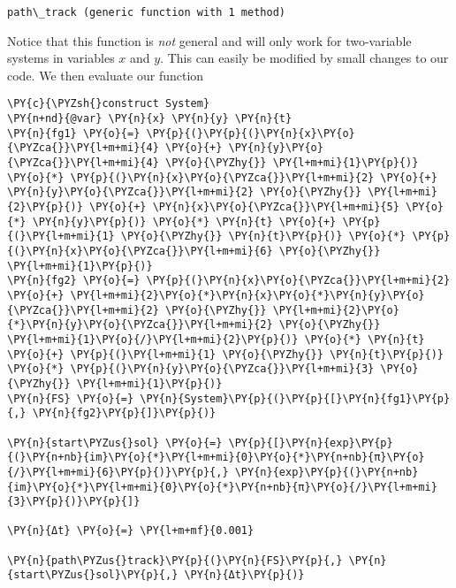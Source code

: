 \documentclass[11pt]{article}
\begin{document}
            \begin{tcolorbox}[breakable, size=fbox, boxrule=.5pt, pad at break*=1mm, opacityfill=0]
\begin{Verbatim}[commandchars=\\\{\}]
path\_track (generic function with 1 method)
\end{Verbatim}
\end{tcolorbox}
        
    Notice that this function is \emph{not} general and will only work for
two-variable systems in variables \(x\) and \(y\). This can easily be
modified by small changes to our code. We then evaluate our function

    \begin{tcolorbox}[breakable, size=fbox, boxrule=1pt, pad at break*=1mm,colback=cellbackground, colframe=cellborder]
\begin{Verbatim}[commandchars=\\\{\}]
\PY{c}{\PYZsh{}construct System}
\PY{n+nd}{@var} \PY{n}{x} \PY{n}{y} \PY{n}{t} 
\PY{n}{fg1} \PY{o}{=} \PY{p}{(}\PY{p}{(}\PY{n}{x}\PY{o}{\PYZca{}}\PY{l+m+mi}{4} \PY{o}{+} \PY{n}{y}\PY{o}{\PYZca{}}\PY{l+m+mi}{4} \PY{o}{\PYZhy{}} \PY{l+m+mi}{1}\PY{p}{)} \PY{o}{*} \PY{p}{(}\PY{n}{x}\PY{o}{\PYZca{}}\PY{l+m+mi}{2} \PY{o}{+} \PY{n}{y}\PY{o}{\PYZca{}}\PY{l+m+mi}{2} \PY{o}{\PYZhy{}} \PY{l+m+mi}{2}\PY{p}{)} \PY{o}{+} \PY{n}{x}\PY{o}{\PYZca{}}\PY{l+m+mi}{5} \PY{o}{*} \PY{n}{y}\PY{p}{)} \PY{o}{*} \PY{n}{t} \PY{o}{+} \PY{p}{(}\PY{l+m+mi}{1} \PY{o}{\PYZhy{}} \PY{n}{t}\PY{p}{)} \PY{o}{*} \PY{p}{(}\PY{n}{x}\PY{o}{\PYZca{}}\PY{l+m+mi}{6} \PY{o}{\PYZhy{}} \PY{l+m+mi}{1}\PY{p}{)}
\PY{n}{fg2} \PY{o}{=} \PY{p}{(}\PY{n}{x}\PY{o}{\PYZca{}}\PY{l+m+mi}{2} \PY{o}{+} \PY{l+m+mi}{2}\PY{o}{*}\PY{n}{x}\PY{o}{*}\PY{n}{y}\PY{o}{\PYZca{}}\PY{l+m+mi}{2} \PY{o}{\PYZhy{}} \PY{l+m+mi}{2}\PY{o}{*}\PY{n}{y}\PY{o}{\PYZca{}}\PY{l+m+mi}{2} \PY{o}{\PYZhy{}} \PY{l+m+mi}{1}\PY{o}{/}\PY{l+m+mi}{2}\PY{p}{)} \PY{o}{*} \PY{n}{t} \PY{o}{+} \PY{p}{(}\PY{l+m+mi}{1} \PY{o}{\PYZhy{}} \PY{n}{t}\PY{p}{)} \PY{o}{*} \PY{p}{(}\PY{n}{y}\PY{o}{\PYZca{}}\PY{l+m+mi}{3} \PY{o}{\PYZhy{}} \PY{l+m+mi}{1}\PY{p}{)}
\PY{n}{FS} \PY{o}{=} \PY{n}{System}\PY{p}{(}\PY{p}{[}\PY{n}{fg1}\PY{p}{,} \PY{n}{fg2}\PY{p}{]}\PY{p}{)}

\PY{n}{start\PYZus{}sol} \PY{o}{=} \PY{p}{[}\PY{n}{exp}\PY{p}{(}\PY{n+nb}{im}\PY{o}{*}\PY{l+m+mi}{0}\PY{o}{*}\PY{n+nb}{π}\PY{o}{/}\PY{l+m+mi}{6}\PY{p}{)}\PY{p}{,} \PY{n}{exp}\PY{p}{(}\PY{n+nb}{im}\PY{o}{*}\PY{l+m+mi}{0}\PY{o}{*}\PY{n+nb}{π}\PY{o}{/}\PY{l+m+mi}{3}\PY{p}{)}\PY{p}{]}

\PY{n}{Δt} \PY{o}{=} \PY{l+m+mf}{0.001}

\PY{n}{path\PYZus{}track}\PY{p}{(}\PY{n}{FS}\PY{p}{,} \PY{n}{start\PYZus{}sol}\PY{p}{,} \PY{n}{Δt}\PY{p}{)}
\end{Verbatim}
\end{tcolorbox}
\end{document}
